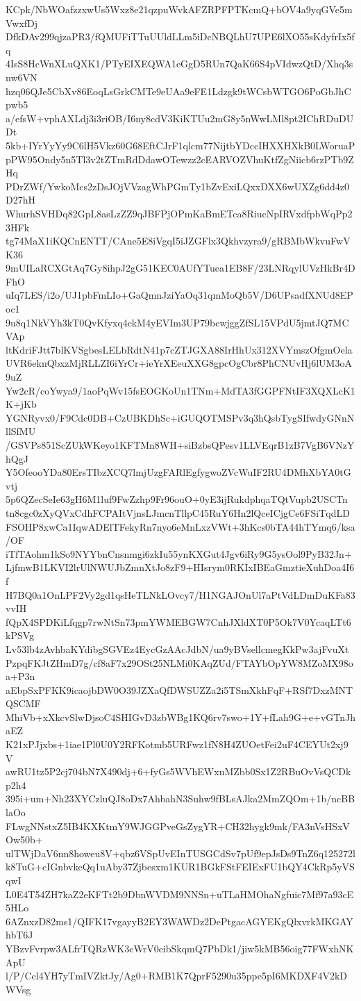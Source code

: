 KCpk/NbWOafzzxwUs5Wxz8e21qzpuWvkAFZRPFPTKcmQ+bOV4a9yqGVe5mVwxfDj
DfkDAv299qjzaPR3/fQMUFiTTuUUldLLm5iDcNBQLhU7UPE6lXO55sKdyfrIx5fq
4IsS8HcWnXLuQXK1/PTyEIXEQWA1eGgD5RUn7QaK66S4pVIdwzQtD/Xhq3snw6VN
hzq06QJe5CbXv86EoqLsGrkCMTe9eUAa9eFE1Ldzgk9tWCsbWTGO6PoGbJhCpwb5
a/efsW+vphAXLdj3i3riOB/I6ny8cdV3KiKTUu2mG8y5nWwLMl8pt2IChRDuDUDt
5kb+IYrYyYy9C6lH5Vkz60G68EftCJrF1qlcm77NijtbYDccIHXXHXkB0LWoruaP
pPW95Ondy5n5Tl3v2tZTmRdDdawOTewzz2cEARVOZVhuKtfZgNiicb6rzPTb9ZHq
PDrZWf/YwkoMcs2zDsJOjVVzagWhPGmTy1bZvExiLQxxDXX6wUXZg6dd4z0D27hH
WhurhSVHDq82GpL8asLzZZ9qJBFPjOPmKaBmETca8RiucNpIRVxdfpbWqPp23HFk
tg74MaX1iKQCnENTT/CAne5E8iVgqI5iJZGFlx3Qkhvzyra9/gRBMbWkvuFwVK36
9mUILaRCXGtAq7Gy8ihpJ2gG51KEC0AUfYTuea1EB8F/23LNRqylUVzHkBr4DFhO
uIq7LES/i2o/UJ1pbFmLIo+GaQmnJziYaOq31qmMoQb5V/D6UPsadfXNUd8EPoc1
9u8q1NkVYh3kT0QvKfyxq4ckM4yEVIm3UP79bewjggZfSL15VPdU5jmtJQ7MCVAp
ltKdriFJtt7blKVSgbesLELbRdtN41p7cZTJGXA88IrHhUx312XVYmszOfgmOela
UVR6eknQbxzMjRLLZI6iYrCr+ieYrXEeuXXG8gpcOgCbr8PhCNUvHj6lUM3oA9uZ
Yw2cR/coYwya9/1aoPqWv15fsEOGKoUn1TNm+MdTA3fGGPFNtIF3XQXLcK1K+jKb
YGNRyvx0/F9Cdc0DB+CzUBKDhSc+iGUQOTMSPv3q3hQsbTygSIfwdyGNnNllSfMU
/GSVPs851ScZUkWKeyo1KFTMn8WH+siBzbsQPesv1LLVEqrB1zB7VgB6VNzYhQgJ
Y5OfeooYDa80ErsTIbzXCQ7lmjUzgFARlEgfygwoZVcWuIF2RU4DMhXbYA0tGvtj
5p6QZecSeIe63gH6M1luf9FwZzhp9Fr96ouO+0yE3ijRukdphqaTQtVupb2USCTn
tn8cgc0zXyQVxCdhFCPAItVjnsLJmcnTllpC45RuY6Hn2lQceICjgCe6FSiTqdLD
FSOHP8xwCa1IqwADElTFekyRn7nyo6eMnLxzVWt+3hKcs0bTA44hTYmq6/ksa/OF
iTfTAohm1kSo9NYYbnCnsnmgi6zkIu55ynKXGut4Jgv6iRy9G5ysOol9PyB32Jn+
LjfmwB1LKVI2lrUlNWUJbZmnXtJo8zF9+HIsrym0RKIxIBEaGmztieXuhDoa4I6f
H7BQ0a1OnLPF2Vy2gd1qsHeTLNkLOvcy7/H1NGAJOnUl7aPtVdLDmDuKFa83vvIH
fQpX4SPDKiLfqgp7rwNtSn73pmYWMEBGW7CnhJXldXT0P5Ok7V0YcaqLTt6kPSVg
Lv53lb4zAvhbaKYdibgSGVEz4EycGzAAcJdbN/ua9yBVsellcmegKkPw3ajFvuXt
PzpqFKJtZHmD7g/cf8aF7x29OSt25NLMi0KAqZUd/FTAYbOpYW8MZoMX98oa+P3n
aEbpSxPFKK9icaojbDW0O39JZXaQfDWSUZZa2i5TSmXkhFqF+RSf7DxzMNTQSCMF
MhiVb+xXkcvSlwDjsoC4SHIGvD3zbWBg1KQ6rv7swo+1Y+fLah9G+e+vGTnJhaEZ
K21xPJjxbs+1iae1Pl0U0Y2RFKotmb5URFwz1fN8H4ZUOetFei2uF4CEYUt2xj9V
awRU1tz5P2cj704bN7X490dj+6+fyGs5WVhEWxnMZbb0Sx1Z2RBuOvVsQCDkp2h4
395i+um+Nh23XYCzluQJ8oDx7AhbahN3Suhw9fBLsAJka2MmZQOm+1b/ncBBlaOo
FLwgNNstxZ5IB4KXKtmY9WJGGPveGsZygYR+CH32hygk9mk/FA3nVsHSxVOw50b+
ulTWjDaV6nn8howeu8V+qbz6VSpUvEInTUSGCdSv7pUf9epJsDs9TnZ6q125272l
k8TuG+cIGnbvkeQq1uAby37Zjbesxm1KUR1BGkFStFEIExFU1bQY4CkRp5yVSqwI
L0E4T54ZH7kaZ2eKFTt2b9DbnWVDM9NNSn+uTLaHMOhaNgfuic7Mf97a93cE5HLo
6AZnxzD82ms1/QIFK17vgayyB2EY3WAWDz2DePtgacAGYEKgQlxvrkMKGAYhbT6J
YBzvFvrpw3ALfrTQRzWK3cWrV0eibSkqmQ7PbDk1/jiw5kMB56oig77FWxhNKApU
l/P/Ccl4YH7yTmIVZktJy/Ag0+RMB1K7QprF5290u35ppe5pI6MKDXF4V2kDWVsg
